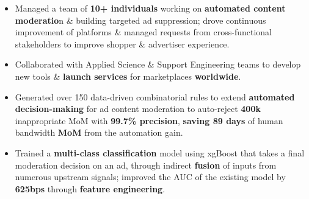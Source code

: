 \divider

{    \begin{itemize}
        \item Managed a team of \textbf{10+ individuals} working on \textbf{automated content moderatio}n \& building targeted ad suppression; drove continuous improvement of platforms \& managed requests from cross-functional stakeholders to improve shopper \& advertiser experience. 
        \item Collaborated with Applied Science \& Support Engineering teams to develop new tools \& \textbf{launch services} for marketplaces \textbf{worldwide}.
        
\end{itemize}}

\divider

{    \begin{itemize}
        \item Generated over 150 data-driven combinatorial rules to extend \textbf{automated decision-making} for ad content moderation to auto-reject \textbf{400k} inappropriate MoM with \textbf{99.7\% precision}, \textbf{saving 89 days} of human bandwidth \textbf{MoM} from the automation gain.
        \item Trained a \textbf{multi-class classification} model using xgBoost that takes a final moderation decision on an ad, through indirect \textbf{fusion} of inputs from numerous upstream signals; improved the AUC of the existing model by \textbf{625bps} through \textbf{feature engineering}.
\end{itemize}}

